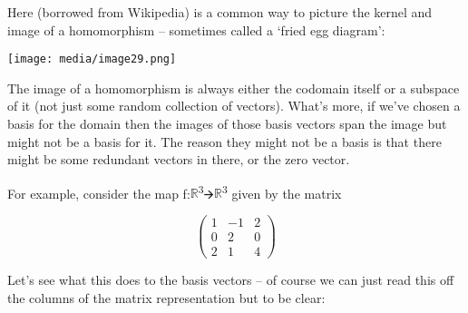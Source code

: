 \documentclass[oneside,english]{amsbook}
\numberwithin{section}{chapter}
\theoremstyle{plain}
\theoremstyle{definition}
\begin{document}
Here (borrowed from Wikipedia) is a common way to picture the kernel and
image of a homomorphism -- sometimes called a `fried egg diagram':

\texttt{[image: media/image29.png]}

The image of a homomorphism is always either the codomain itself or a
subspace of it (not just some random collection of vectors). What's
more, if we've chosen a basis for the domain then the images of those
basis vectors span the image but might not be a basis for it. The reason
they might not be a basis is that there might be some redundant vectors
in there, or the zero vector.

For example, consider the map
f:$\mathbb{R}$\textsuperscript{3}🡪$\mathbb{R}$\textsuperscript{3} given by
the matrix

\[\begin{pmatrix}
	1 & - 1 & 2 \\
	0 & 2 & 0 \\
	2 & 1 & 4
\end{pmatrix}\]

Let's see what this does to the basis vectors -- of course we can just
read this off the columns of the matrix representation but to be clear:
\end{document}
